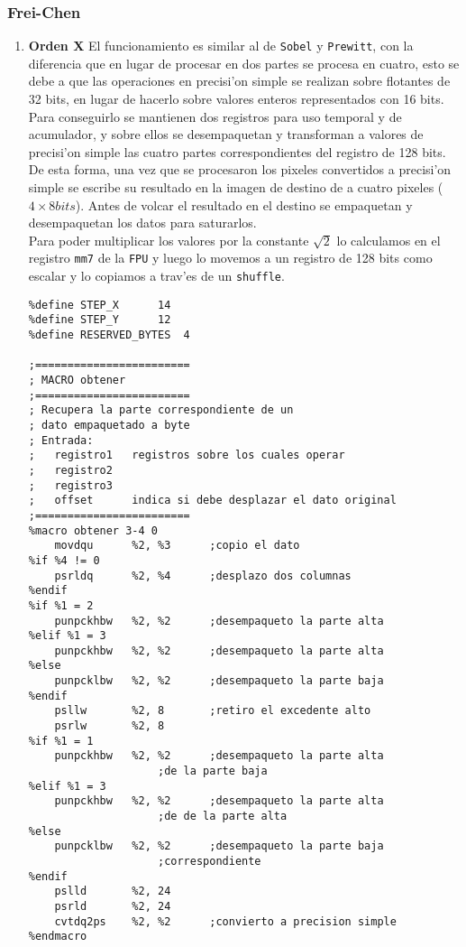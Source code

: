 \documentclass[11pt]{article}
\begin{document}
\subsubsection{Frei-Chen} 
\begin{enumerate}
\item \textbf{Orden X}
\subitem El funcionamiento es similar al de \verb'Sobel' y \verb'Prewitt', con la diferencia que en lugar de procesar en dos partes se procesa en cuatro, esto se debe a que las operaciones en precisi'on simple se realizan sobre flotantes de 32 bits, en lugar de hacerlo sobre valores enteros representados con 16 bits.  Para conseguirlo se mantienen dos registros para uso temporal y de acumulador, y sobre ellos se desempaquetan y transforman a valores de precisi'on simple las cuatro partes correspondientes del registro de 128 bits.  De esta forma, una vez que se procesaron los pixeles convertidos a precisi'on simple se escribe su resultado en la imagen de destino de a cuatro pixeles ($4 \times 8 bits$).  Antes de volcar el resultado en el destino se empaquetan y desempaquetan los datos para saturarlos.\\
Para poder multiplicar los valores por la constante $\sqrt{2}$ lo calculamos en el registro \verb'mm7' de la \verb'FPU' y luego lo movemos a un registro de 128 bits como escalar y lo copiamos a trav'es de un \verb'shuffle'.
\begin{lstlisting}[frame=single]
%define REMAINDER	[ebp - 4]
%define	STEP_X		14
%define	STEP_Y		12
%define RESERVED_BYTES	4

;========================
; MACRO obtener
;========================
; Recupera la parte correspondiente de un 
; dato empaquetado a byte
; Entrada:
;	registro1	registros sobre los cuales operar 
;	registro2
;	registro3
;	offset		indica si debe desplazar el dato original
;========================
%macro obtener 3-4 0
	movdqu		%2, %3		;copio el dato
%if %4 != 0
	psrldq		%2, %4		;desplazo dos columnas
%endif
%if %1 = 2
	punpckhbw	%2, %2		;desempaqueto la parte alta
%elif %1 = 3
	punpckhbw	%2, %2		;desempaqueto la parte alta
%else
	punpcklbw	%2, %2		;desempaqueto la parte baja
%endif
	psllw		%2, 8		;retiro el excedente alto
	psrlw		%2, 8
%if %1 = 1
	punpckhbw	%2, %2		;desempaqueto la parte alta
					;de la parte baja
%elif %1 = 3
	punpckhbw	%2, %2		;desempaqueto la parte alta 
					;de de la parte alta
%else
	punpcklbw	%2, %2		;desempaqueto la parte baja 
					;correspondiente
%endif
	pslld		%2, 24
	psrld		%2, 24
	cvtdq2ps	%2, %2		;convierto a precision simple
%endmacro


\end{lstlisting}
\end{enumerate}
\end{document}
